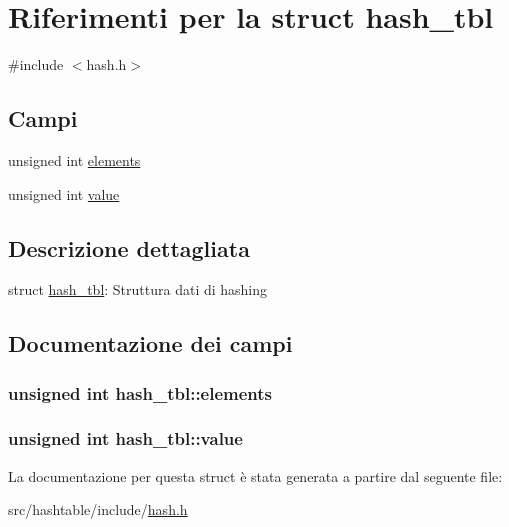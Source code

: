 \hypertarget{structhash__tbl}{
\section{Riferimenti per la struct hash\_\-tbl}
\label{structhash__tbl}
}


{\ttfamily \#include $<$hash.h$>$}

\subsection*{Campi}
\begin{DoxyCompactItemize}
\item 
unsigned int \hyperlink{structhash__tbl_a2e5c0eaf53366ff9035d6df7f2573da4}{elements}
\item 
unsigned int \hyperlink{structhash__tbl_a92ab2049c1a00e9dcd20c26f22462f77}{value}
\end{DoxyCompactItemize}


\subsection{Descrizione dettagliata}
struct \hyperlink{structhash__tbl}{hash\_\-tbl}: Struttura dati di hashing 

\subsection{Documentazione dei campi}
\hypertarget{structhash__tbl_a2e5c0eaf53366ff9035d6df7f2573da4}{
\subsubsection[{elements}]{\setlength{\rightskip}{0pt plus 5cm}unsigned int {\bf hash\_\-tbl::elements}}}
\label{structhash__tbl_a2e5c0eaf53366ff9035d6df7f2573da4}
\hypertarget{structhash__tbl_a92ab2049c1a00e9dcd20c26f22462f77}{
\subsubsection[{value}]{\setlength{\rightskip}{0pt plus 5cm}unsigned int {\bf hash\_\-tbl::value}}}
\label{structhash__tbl_a92ab2049c1a00e9dcd20c26f22462f77}


La documentazione per questa struct è stata generata a partire dal seguente file:\begin{DoxyCompactItemize}
\item 
src/hashtable/include/\hyperlink{hash_8h}{hash.h}\end{DoxyCompactItemize}
